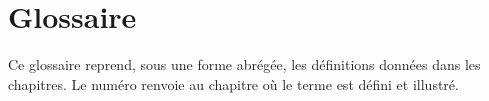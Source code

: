 
\chapter{Glossaire}
\label{ann:glossaire}

Ce glossaire reprend, sous une forme abrégée, les définitions données dans
les chapitres. Le numéro renvoie au chapitre où le terme est défini et
illustré.

